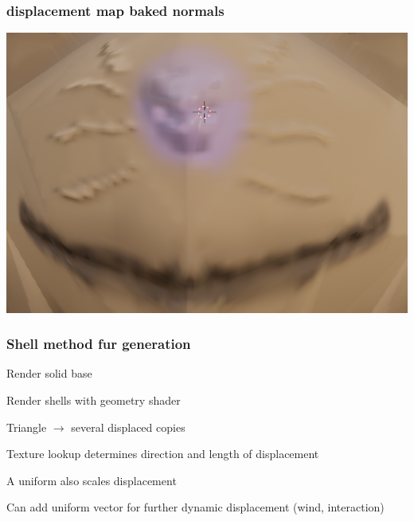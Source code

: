 \documentclass[12pt]{beamer}
\begin{document}
    \begin{frame}
        \frametitle{ displacement map baked normals }
        \includegraphics[width=\textwidth]{nosewhiskers}
    \end{frame}

    \begin{frame}
        \frametitle{ Shell method fur generation }

        Render solid base

        Render shells with geometry shader

        Triangle $\rightarrow$ several displaced copies

        Texture lookup determines direction and length of displacement

        A uniform also scales displacement
        
        Can add uniform vector for further dynamic displacement (wind, interaction)
        
    \end{frame}
    
\end{document}
